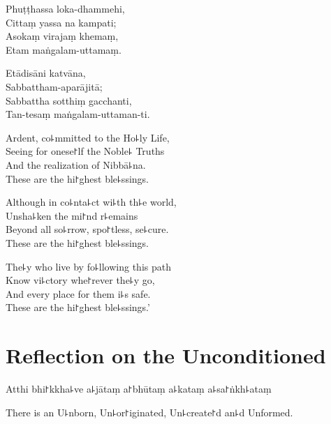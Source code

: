 Phuṭṭhassa loka-dhammehi,\\
Cittaṃ yassa na kampati;\\
Asokaṃ virajaṃ khemaṃ,\\
Etam maṅgalam-uttamaṃ.

Etādisāni katvāna,\\
Sabbattham-aparājitā;\\
Sabbattha sotthiṃ gacchanti,\\
Tan-tesaṃ maṅgalam-uttaman-ti.




\clearpage

Ardent, co꜕mmitted to the Ho꜕ly Life,\\%
Seeing for onese꜓lf the Noble꜕ Truths\\
And the realization of Nibbā꜕na.\\
These are the hi꜓ghest ble꜕ssings.

Although in co꜕nta꜕ct wi꜕th th꜕e world,\\
Unsha꜕ken the mi꜓nd r꜕emains\\
Beyond all so꜕rrow, spo꜓tless, se꜕cure.\\
These are the hi꜓ghest ble꜕ssings.

The꜕y who live by fo꜕llowing this path\\
Know vi꜕ctory whe꜓rever the꜕y go,\\
And every place for them i꜕s safe.\\
These are the hi꜓ghest ble꜕ssings.'



\chapter[The Unconditioned]{Reflection on the Unconditioned}%

\begin{leader}
\end{leader}

Atthi bhi꜓kkha꜕ve a꜕jātaṃ a꜓bhūtaṃ a꜕kataṃ a꜕sa꜓ṅkh꜕ataṃ

\begin{english}
  There is an U꜕nborn, Un꜕or꜓iginated, Un꜕create꜓d an꜕d Unformed.
\end{english}

